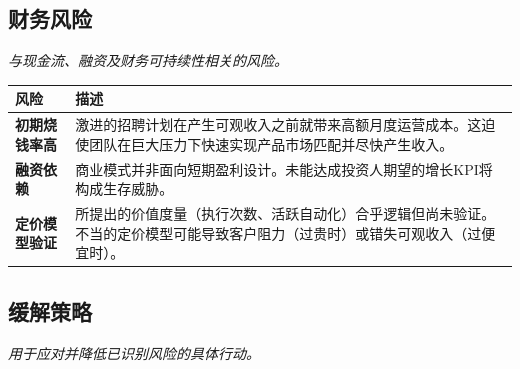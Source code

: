 \documentclass[11pt, a4paper, oneside]{article}
\begin{document}
\newpage
\subsection{财务风险}
\textit{与现金流、融资及财务可持续性相关的风险。}

\begin{table}[H]
\centering
\begin{tabularx}{\textwidth}{@{}lL@{}}
\toprule
\textbf{风险} & \textbf{描述} \\
\midrule
\textbf{初期烧钱率高} & 激进的招聘计划在产生可观收入之前就带来高额月度运营成本。这迫使团队在巨大压力下快速实现产品市场匹配并尽快产生收入。 \\
\addlinespace
\textbf{融资依赖} & 商业模式并非面向短期盈利设计。未能达成投资人期望的增长KPI将构成生存威胁。 \\
\addlinespace
\textbf{定价模型验证} & 所提出的价值度量（执行次数、活跃自动化）合乎逻辑但尚未验证。不当的定价模型可能导致客户阻力（过贵时）或错失可观收入（过便宜时）。 \\
\bottomrule
\end{tabularx}
\end{table}

\newpage
\subsection{缓解策略}
\textit{用于应对并降低已识别风险的具体行动。}
\end{document}
